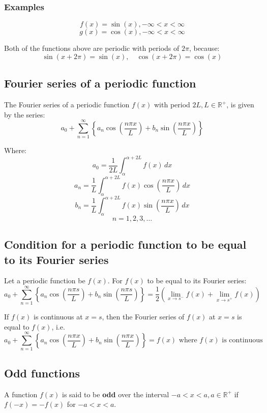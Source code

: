 \documentclass[11pt]{article}
\begin{document}
\subsubsection{Examples}
\label{sec:org433db83}
\[f(x) = \sin (x), - \infty < x < \infty\]
\[g(x) = \cos (x), - \infty < x < \infty\]

Both of the functions above are periodic with periods of \(2 \pi\), because:
\[\sin(x + 2 \pi) = \sin (x), \quad \cos (x + 2 \pi) = \cos (x)\]

\subsection{Fourier series of a periodic function}
\label{sec:orgb830aea}
The Fourier series of a periodic function \(f(x)\) with period \(2L, L \in \mathbb{R}^+\), is given by the series:
\[a_0 + \sum_{n = 1}^{\infty} \left\{a_n \cos \left( \frac{n \pi x}{L} \right) + b_n \sin \left( \frac{n \pi x}{L} \right) \right\}\]

Where:
\[a_0 = \frac{1}{2L} \int_{\alpha}^{\alpha + 2L} f(x) \, dx\]
\[a_n = \frac{1}{L} \int_{\alpha}^{\alpha + 2L} f(x) \cos \left( \frac{n \pi x}{L} \right) \, dx\]
\[b_n = \frac{1}{L} \int_{\alpha}^{\alpha + 2L} f(x) \sin \left( \frac{n \pi x}{L} \right) \, dx\]
\[n = 1, 2, 3, \ldots\]

\subsection{Condition for a periodic function to be equal to its Fourier series}
\label{sec:org297ae12}
Let a periodic function be \(f(x)\). For \(f(x)\) to be equal to its Fourier series:
\[a_0 + \sum_{n = 1}^{\infty} \left\{a_n \cos \left( \frac{n \pi s}{L} \right) + b_n \sin \left( \frac{n \pi s}{L} \right) \right\} = \frac{1}{2} \left( \lim_{x \rightarrow s^{-}} f(x) + \lim_{x \rightarrow s^{+}} f(x) \right)\]

If \(f(x)\) is continuous at \(x = s\), then the Fourier series of \(f(x)\) at \(x = s\) is equal to \(f(x)\), i.e.
\[a_0 + \sum_{n = 1}^{\infty} \left\{a_n \cos \left( \frac{n \pi x}{L} \right) + b_n \sin \left( \frac{n \pi x}{L} \right) \right\} = f(x) \text{ where } f(x) \text{ is continuous}\]

\subsection{Odd functions}
\label{sec:org04c6972}
A function \(f(x)\) is said to be \textbf{odd} over the interval \(- a < x < a, a \in \mathbb{R}^{+}\) if \(f(-x) = - f(x)\) for \(-a < x < a\).  \\
\end{document}
